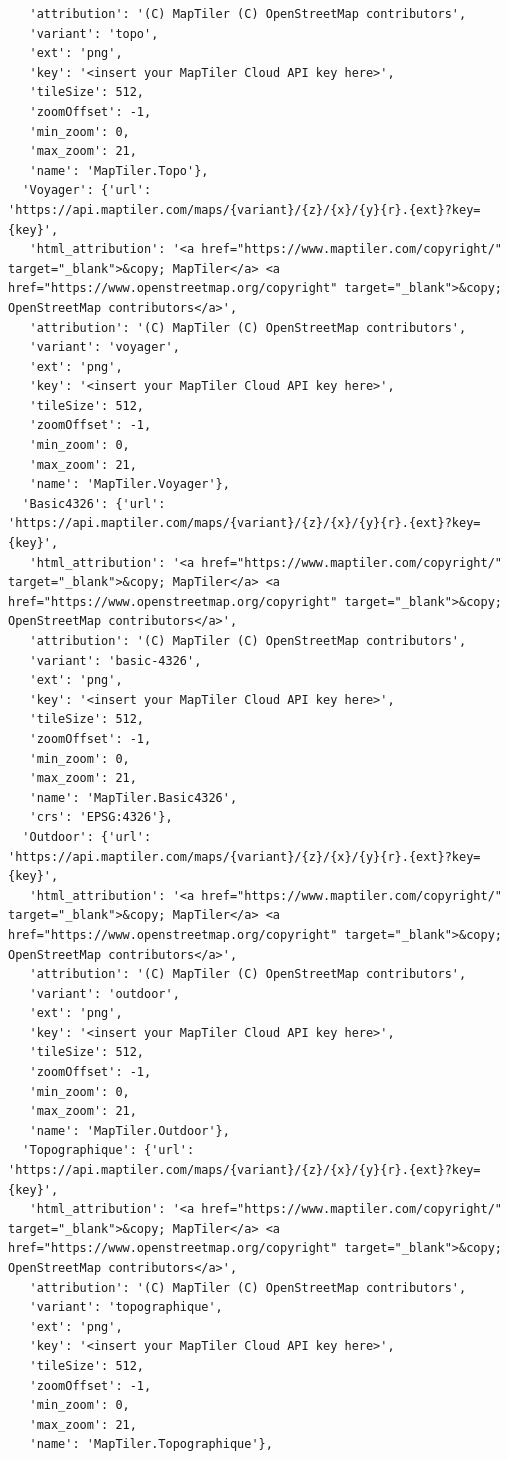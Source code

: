 \documentclass[
  letterpaper,
  DIV=11,
  numbers=noendperiod]{scrreprt}
\begin{document}
\begin{verbatim}
   'attribution': '(C) MapTiler (C) OpenStreetMap contributors',
   'variant': 'topo',
   'ext': 'png',
   'key': '<insert your MapTiler Cloud API key here>',
   'tileSize': 512,
   'zoomOffset': -1,
   'min_zoom': 0,
   'max_zoom': 21,
   'name': 'MapTiler.Topo'},
  'Voyager': {'url': 'https://api.maptiler.com/maps/{variant}/{z}/{x}/{y}{r}.{ext}?key={key}',
   'html_attribution': '<a href="https://www.maptiler.com/copyright/" target="_blank">&copy; MapTiler</a> <a href="https://www.openstreetmap.org/copyright" target="_blank">&copy; OpenStreetMap contributors</a>',
   'attribution': '(C) MapTiler (C) OpenStreetMap contributors',
   'variant': 'voyager',
   'ext': 'png',
   'key': '<insert your MapTiler Cloud API key here>',
   'tileSize': 512,
   'zoomOffset': -1,
   'min_zoom': 0,
   'max_zoom': 21,
   'name': 'MapTiler.Voyager'},
  'Basic4326': {'url': 'https://api.maptiler.com/maps/{variant}/{z}/{x}/{y}{r}.{ext}?key={key}',
   'html_attribution': '<a href="https://www.maptiler.com/copyright/" target="_blank">&copy; MapTiler</a> <a href="https://www.openstreetmap.org/copyright" target="_blank">&copy; OpenStreetMap contributors</a>',
   'attribution': '(C) MapTiler (C) OpenStreetMap contributors',
   'variant': 'basic-4326',
   'ext': 'png',
   'key': '<insert your MapTiler Cloud API key here>',
   'tileSize': 512,
   'zoomOffset': -1,
   'min_zoom': 0,
   'max_zoom': 21,
   'name': 'MapTiler.Basic4326',
   'crs': 'EPSG:4326'},
  'Outdoor': {'url': 'https://api.maptiler.com/maps/{variant}/{z}/{x}/{y}{r}.{ext}?key={key}',
   'html_attribution': '<a href="https://www.maptiler.com/copyright/" target="_blank">&copy; MapTiler</a> <a href="https://www.openstreetmap.org/copyright" target="_blank">&copy; OpenStreetMap contributors</a>',
   'attribution': '(C) MapTiler (C) OpenStreetMap contributors',
   'variant': 'outdoor',
   'ext': 'png',
   'key': '<insert your MapTiler Cloud API key here>',
   'tileSize': 512,
   'zoomOffset': -1,
   'min_zoom': 0,
   'max_zoom': 21,
   'name': 'MapTiler.Outdoor'},
  'Topographique': {'url': 'https://api.maptiler.com/maps/{variant}/{z}/{x}/{y}{r}.{ext}?key={key}',
   'html_attribution': '<a href="https://www.maptiler.com/copyright/" target="_blank">&copy; MapTiler</a> <a href="https://www.openstreetmap.org/copyright" target="_blank">&copy; OpenStreetMap contributors</a>',
   'attribution': '(C) MapTiler (C) OpenStreetMap contributors',
   'variant': 'topographique',
   'ext': 'png',
   'key': '<insert your MapTiler Cloud API key here>',
   'tileSize': 512,
   'zoomOffset': -1,
   'min_zoom': 0,
   'max_zoom': 21,
   'name': 'MapTiler.Topographique'},

\end{verbatim}
\end{document}
